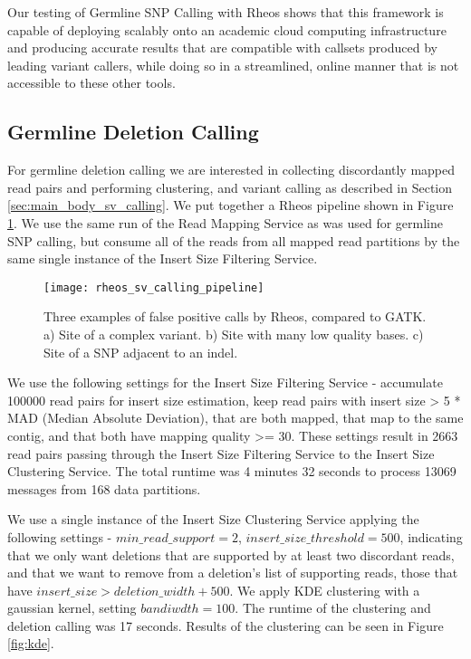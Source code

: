 Our testing of Germline SNP Calling with Rheos shows that this framework is capable of deploying scalably onto an academic cloud computing infrastructure and producing accurate results that are compatible with callsets produced by leading variant callers, while doing so in a streamlined, online manner that is not accessible to these other tools.

\subsection{Germline Deletion Calling}

For germline deletion calling we are interested in collecting discordantly mapped read pairs and performing clustering, and variant calling as described in Section \ref{sec:main_body_sv_calling}. We put together a Rheos pipeline shown in Figure \ref{fig:rheos_sv_calling_pipeline}. We use the same run of the Read Mapping Service as was used for germline SNP calling, but consume all of the reads from all mapped read partitions by the same single instance of the Insert Size Filtering Service.

\begin{figure}[h!]
    \texttt{[image: rheos\_sv\_calling\_pipeline]}
    \centering
    \caption {Three examples of false positive calls by Rheos, compared to GATK. a) Site of a complex variant. b) Site with many low quality bases. c) Site of a SNP adjacent to an indel.}
    \label{fig:rheos_sv_calling_pipeline}
\end{figure}

We use the following settings for the Insert Size Filtering Service - accumulate 100000 read pairs for insert size estimation, keep read pairs with insert size > 5 * MAD (Median Absolute Deviation), that are both mapped, that map to the same contig, and that both have mapping quality >= 30. These settings result in 2663 read pairs passing through the Insert Size Filtering Service to the Insert Size Clustering Service. The total runtime was 4 minutes 32 seconds to process 13069 messages from 168 data partitions.

We use a single instance of the Insert Size Clustering Service applying the following settings - $min\_read\_support = 2$, $insert\_size\_threshold = 500$, indicating that we only want deletions that are supported by at least two discordant reads, and that we want to remove from a deletion's list of supporting reads, those that have $insert\_size > deletion\_width + 500$. We apply KDE clustering with a gaussian kernel, setting $bandiwdth = 100$. The runtime of the clustering and deletion calling was 17 seconds. Results of the clustering can be seen in Figure \ref{fig:kde}.

